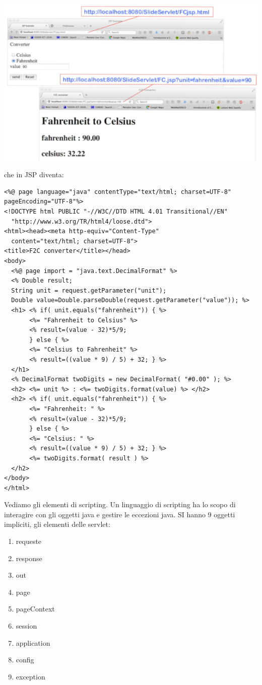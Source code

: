 \documentclass[a4paper,12pt, oneside]{book}
\begin{document}
\begin{center}
	\includegraphics[scale=2.4]{img/jsp3.png}
\end{center}
\newpage
che in JSP diventa:
\begin{verbatim}
<%@ page language="java" contentType="text/html; charset=UTF-8" pageEncoding="UTF-8"%>
<!DOCTYPE html PUBLIC "-//W3C//DTD HTML 4.01 Transitional//EN" 
  "http://www.w3.org/TR/html4/loose.dtd">
<html><head><meta http-equiv="Content-Type" 
  content="text/html; charset=UTF-8">
<title>F2C converter</title></head>
<body>
  <%@ page import = "java.text.DecimalFormat" %>
  <% Double result;
  String unit = request.getParameter("unit");
  Double value=Double.parseDouble(request.getParameter("value")); %>
  <h1> <% if( unit.equals("fahrenheit")) { %>
       <%= "Fahrenheit to Celsius" %>
       <% result=(value - 32)*5/9;
       } else { %>
       <%= "Celsius to Fahrenheit" %> 
       <% result=((value * 9) / 5) + 32; } %>
  </h1>
  <% DecimalFormat twoDigits = new DecimalFormat( "#0.00" ); %>
  <h2> <%= unit %> : <%= twoDigits.format(value) %> </h2>
  <h2> <% if( unit.equals("fahrenheit")) { %>
       <%= "Fahrenheit: " %>
       <% result=(value - 32)*5/9;
       } else { %>
       <%= "Celsius: " %>
       <% result=((value * 9) / 5) + 32; } %>
       <%= twoDigits.format( result ) %>
  </h2>
</body>
</html>
\end{verbatim}
\newpage
Vediamo gli elementi di scripting. Un linguaggio di scripting ha lo scopo di interagire con gli oggetti java e gestire le eccezioni java. SI hanno 9 oggetti impliciti, gli elementi delle servlet:
\begin{enumerate}
	\item requeste
	\item response
	\item out
	\item page
	\item pageContext
	\item session
	\item application
	\item config
	\item exception
\end{enumerate}
\end{document}
